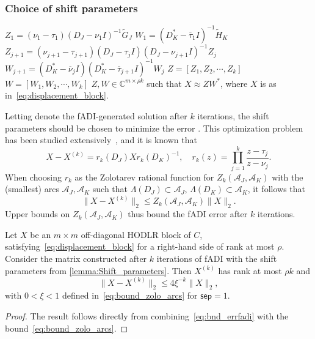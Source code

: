 \documentclass[final,reqno,onefignum,onetabnum]{siamart190516}
\newcommand{\sep}{\mathsf{sep}}
\begin{document}
\subsubsection{Choice of shift parameters}
\begin{algorithm}[t!]
  \caption{fADI for the low rank approximation of a Cauchy-like matrix} \label{alg:fadicauchy}
  \begin{algorithmic}[1]
\State $Z_1 = (\nu_1-\tau_1) (D_J - \nu_1 I)^{-1}\widetilde{G}_J$
\State$W_1 = (D_K^*-\overline{\tau}_1 I)^{-1}\widetilde{H}_K$
	\State $Z_{j +1} = (\nu_{j+1}-\tau_{j+1}) (D_J - \tau_jI) (D_J-\nu_{j+1} I)^{-1} Z_j$
	\State $W_{j+1} = (D_K^* - \overline{\nu}_j I) (D_{K}^* - \overline{\tau}_{j+1} I)^{-1} W_j$
    \EndFor
\State $Z = \left[ Z_1, Z_2, \cdots, Z_k \right]$
\State $W = \left[ W_1, W_2, \cdots, W_k \right]$
   \EndProcedure
{} $Z,W \in \mathbb{C}^{m \times \rho k}$ such that $X \approx ZW^*$, where $X$ is as in~\eqref{eq:displacement_block}. 
 \end{algorithmic}
\end{algorithm}
Letting  denote the fADI-generated solution after $k$ iterations, the shift parameters should be chosen to minimize the error . This optimization problem has been studied extensively~\cite{Beckermann2019, lebedev1977zolotarev, lu1991solution, sabino2007solution}, and it is known that 
\begin{equation} 
\label{eq:ADIerror}
X - X^{(k)} = r_k(D_J) X r_k(D_K)^{-1},  \quad r_k(z) = \prod_{j = 1}^k \dfrac{z - \tau_j}{z-\nu_j}.
\end{equation} 
When choosing $r_k$ as the Zolotarev rational function for 
$Z_k(\mathcal{A}_J, \mathcal{A}_K)$ with the (smallest) arcs $\mathcal{A}_J, \mathcal{A}_K$ such that
$\Lambda(D_J) \subset \mathcal A_J $, $\Lambda(D_K) \subset \mathcal A_K$, it follows that
\begin{equation} \label{eq:bnd_errfadi}
\|X-X^{(k)}\|_2 \leq Z_k(\mathcal{A}_J, \mathcal{A}_K) \|X\|_2.
\end{equation}
Upper bounds on $Z_k(\mathcal{A}_J, \mathcal{A}_K)$ thus bound the fADI error after $k$ iterations. 

\begin{corollary}
\label{corr:ADIbounds}
Let $X$ be an $m\times m$ off-diagonal HODLR block of $C$, satisfying~\eqref{eq:displacement_block} for a right-hand side of rank at most $\rho$.
Consider the matrix  constructed after $k$ iterations of fADI with the 
shift parameters  from \cref{lemma:Shift_parameters}.
Then $X^{(k)}$ has rank at most $\rho k$ and
$$ \|X-X^{(k)}\|_2 \leq 4 \xi^{-k} \|X\|_2,$$
with $0 < \xi <1$ defined in~\eqref{eq:bound_zolo_arcs} for $\sep = 1$.
\end{corollary} 
\begin{proof}
The result follows directly from combining~\eqref{eq:bnd_errfadi} with the bound~\eqref{eq:bound_zolo_arcs}. 
\end{proof} 
\end{document}
